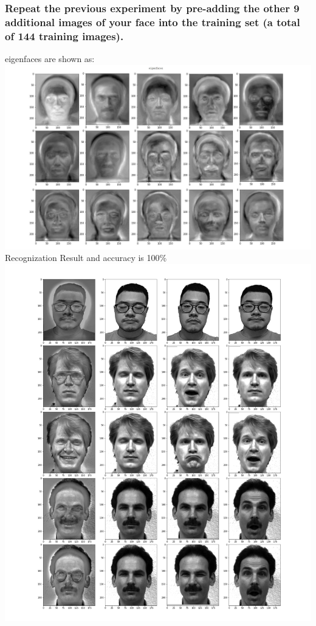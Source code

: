 \documentclass[]{article}
\begin{document}
\subsubsection{Repeat the previous experiment by pre-adding the other 9 additional images of your face into the training set (a total of 144 training images).}
eigenfaces are shown as:\\
\includegraphics[width=15cm]{eigenfaces2.jpg}\\
Recognization Result and accuracy is 100\%\\
\includegraphics[width=15cm]{result1.jpg}\\
\end{document}
